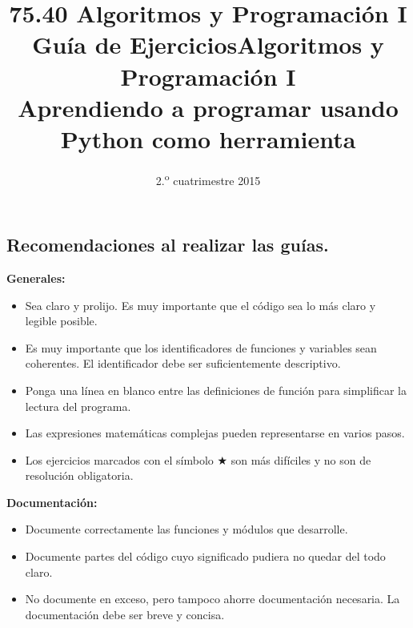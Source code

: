 \documentclass[11pt,spanish,a4paper,twoside,openany]{book}
\title{75.40 Algoritmos y Programación I \\
    \textbf{Guía de Ejercicios}}
\date{2.\textsuperscript{o} cuatrimestre 2015}
\theoremstyle{definition}
\theoremstyle{definition}
\theoremstyle{remark}
\begin{document}
\begin{extract} %
\maketitle
\thispagestyle{empty}

\newpage

\section*{Recomendaciones al realizar las guías.}

\textbf{Generales:}
\begin{itemize}
	\item Sea claro y prolijo. Es muy importante que el código sea lo más claro y legible posible.
	\item Es muy importante que los identificadores de funciones y variables sean coherentes. El identificador debe ser suficientemente descriptivo.
	\item Ponga una línea en blanco entre las definiciones de función para simplificar la lectura del programa.
	\item Las expresiones matemáticas complejas pueden representarse en varios pasos.
	\item Los ejercicios marcados con el símbolo $\bigstar$ son más difíciles y no son de resolución obligatoria.
\end{itemize}

\textbf{Documentación:}
\begin{itemize}
	\item Documente correctamente las funciones y módulos que desarrolle.
	\item Documente partes del código cuyo significado pudiera no quedar del todo claro.
	\item No documente en exceso, pero tampoco ahorre documentación necesaria. La documentación debe ser breve y concisa.
\end{itemize}
\end{extract}

%
\title{Algoritmos y Programación I \\ Aprendiendo a programar usando Python como herramienta}
\date{}
\maketitle

\tableofcontents  %
\end{document}
